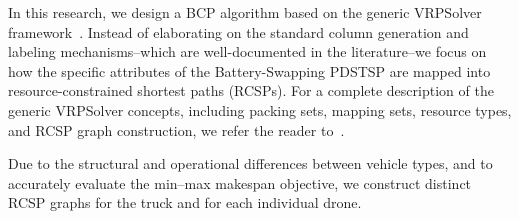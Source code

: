 \documentclass[3p, authoryear, 11pt]{elsarticle}
\begin{document}


In this research, we design a BCP algorithm based on the generic VRPSolver framework~\citep{pessoa_generic_2020}. Instead of elaborating on the standard column generation and labeling mechanisms--which are well-documented in the literature--we focus on how the specific attributes of the Battery-Swapping PDSTSP are mapped into resource-constrained shortest paths (RCSPs). For a complete description of the generic VRPSolver concepts, including packing sets, mapping sets, resource types, and RCSP graph construction, we refer the reader to~\citet{pessoa_generic_2020}.

Due to the structural and operational differences between vehicle types, and to accurately evaluate the min--max makespan objective, we construct distinct RCSP graphs for the truck and for each individual drone.
\end{document}
